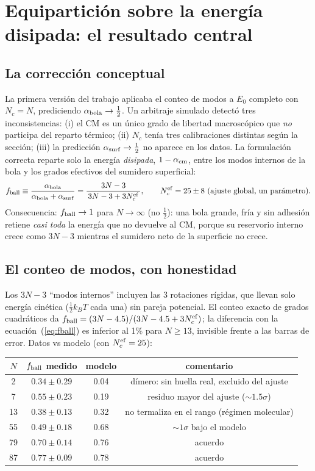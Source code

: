 \documentclass[11pt,a4paper]{article}
\newcommand{\kb}{k_B}
\begin{document}
\section{Equipartición sobre la energía disipada: el resultado central}
\label{sec:equiparticion}

\subsection{La corrección conceptual}
La primera versión del trabajo aplicaba el conteo de modos a $E_0$ completo
con $N_c = N$, prediciendo $\alpha_{\rm bola}\to\tfrac12$. Un arbitraje
simulado detectó tres inconsistencias: (i) el CM es un único grado de
libertad macroscópico que \emph{no} participa del reparto térmico; (ii)
$N_c$ tenía tres calibraciones distintas según la sección; (iii) la
predicción $\alpha_{\rm surf}\to\tfrac12$ no aparece en los datos. La
formulación correcta reparte solo la energía \emph{disipada},
$1-\alpha_{\rm cm}$, entre los modos internos de la bola y los grados
efectivos del sumidero superficial:
\begin{equation}
f_{\rm ball} \equiv
\frac{\alpha_{\rm bola}}{\alpha_{\rm bola}+\alpha_{\rm surf}}
= \frac{3N-3}{\,3N-3+3N_c^{\rm ef}\,},
\qquad N_c^{\rm ef} = 25\pm8\ \text{(ajuste global, un parámetro)}.
\label{eq:fball}
\end{equation}
Consecuencia: $f_{\rm ball}\to1$ para $N\to\infty$ (no $\tfrac12$): una
bola grande, fría y sin adhesión retiene \emph{casi toda} la energía que no
devuelve al CM, porque su reservorio interno crece como $3N-3$ mientras el
sumidero neto de la superficie no crece.

\subsection{El conteo de modos, con honestidad}
Los $3N-3$ ``modos internos'' incluyen las 3 rotaciones rígidas, que llevan
solo energía cinética ($\tfrac12\kb T$ cada una) sin pareja potencial. El
conteo exacto de grados cuadráticos da
$f_{\rm ball} = (3N-4.5)/(3N-4.5+3N_c^{\rm ef})$; la diferencia con la
ecuación~(\ref{eq:fball}) es inferior al 1\% para $N\ge13$, invisible
frente a las barras de error. Datos vs modelo (con $N_c^{\rm ef}=25$):

\begin{center}
\begin{tabular}{cccc}
\toprule
$N$ & $f_{\rm ball}$ medido & modelo & comentario\\
\midrule
2  & $0.34\pm0.29$ & 0.04 & dímero: sin huella real, excluido del ajuste\\
7  & $0.55\pm0.23$ & 0.19 & residuo mayor del ajuste ($\sim1.5\sigma$)\\
13 & $0.38\pm0.13$ & 0.32 & no termaliza en el rango (régimen molecular)\\
55 & $0.49\pm0.18$ & 0.68 & $\sim1\sigma$ bajo el modelo\\
79 & $0.70\pm0.14$ & 0.76 & acuerdo\\
87 & $0.77\pm0.09$ & 0.78 & acuerdo\\
\bottomrule
\end{tabular}
\end{center}
\end{document}
